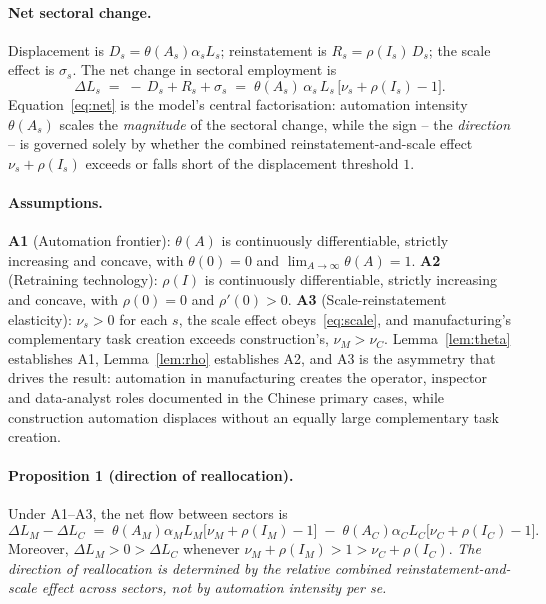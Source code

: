 \documentclass[12pt]{article}
\begin{document}
\paragraph{Net sectoral change.} Displacement is $D_s=\theta(A_s)\alpha_s L_s$; reinstatement is $R_s=\rho(I_s)\,D_s$; the scale effect is $\sigma_s$. The net change in sectoral employment is
\begin{equation}
\Delta L_s \;=\; -\,D_s + R_s + \sigma_s \;=\; \theta(A_s)\,\alpha_s\,L_s\,\bigl[\nu_s+\rho(I_s)-1\bigr].
\label{eq:net}
\end{equation}
Equation~\eqref{eq:net} is the model's central factorisation: automation intensity $\theta(A_s)$ scales the \emph{magnitude} of the sectoral change, while the sign -- the \emph{direction} -- is governed solely by whether the combined reinstatement-and-scale effect $\nu_s+\rho(I_s)$ exceeds or falls short of the displacement threshold $1$.

\paragraph{Assumptions.} \textbf{A1} (Automation frontier): $\theta(A)$ is continuously differentiable, strictly increasing and concave, with $\theta(0)=0$ and $\lim_{A\to\infty}\theta(A)=1$. \textbf{A2} (Retraining technology): $\rho(I)$ is continuously differentiable, strictly increasing and concave, with $\rho(0)=0$ and $\rho'(0)>0$. \textbf{A3} (Scale-reinstatement elasticity): $\nu_s>0$ for each $s$, the scale effect obeys~\eqref{eq:scale}, and manufacturing's complementary task creation exceeds construction's, $\nu_M>\nu_C$. Lemma~\ref{lem:theta} establishes A1, Lemma~\ref{lem:rho} establishes A2, and A3 is the asymmetry that drives the result: automation in manufacturing creates the operator, inspector and data-analyst roles documented in the Chinese primary cases, while construction automation displaces without an equally large complementary task creation.

\paragraph{Proposition 1 (direction of reallocation).} Under A1--A3, the net flow between sectors is
\begin{equation}
\Delta L_M-\Delta L_C \;=\; \theta(A_M)\alpha_M L_M\bigl[\nu_M+\rho(I_M)-1\bigr] \;-\; \theta(A_C)\alpha_C L_C\bigl[\nu_C+\rho(I_C)-1\bigr].
\end{equation}
Moreover, $\Delta L_M>0>\Delta L_C$ whenever $\nu_M+\rho(I_M)>1>\nu_C+\rho(I_C)$. \emph{The direction of reallocation is determined by the relative combined reinstatement-and-scale effect across sectors, not by automation intensity per se.}
\end{document}
